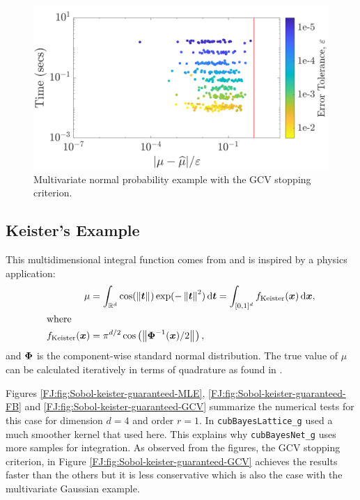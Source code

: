 \documentclass[graybox,footinfo]{svmult}
\newcommand{\norm}[2][{}]{\ensuremath{\left \lVert #2 \right \rVert}_{#1}}
\begin{document}
\begin{figure}
\centering
\includegraphics[width=0.95\linewidth]{"figures/Sobol/Sobol_MVN_guaranteed_time_GCV__d2_r1_2019-Sep-1"}
\caption[Sobol: MVN guaranteed: GCV]{Multivariate normal probability example with the GCV stopping criterion.}
\label{FJ:fig:Sobol-mvn-guaranteed-GCV}
\end{figure}






\subsection{Keister's Example}

This multidimensional integral function comes from \cite{Kei96} and is inspired by a physics application:
\begin{align}
\label{FJ:eqn:keister_integral}
\mu  &=  \int_{\R^d} \cos(\norm{ \bst}) \exp(-\norm{ \bst }^2) \, \textup{d}\bst 
= \int_{[0,1]^d} f_{\textup{Keister}}(\bsx) \, \textup{d}\bsx,\\
\intertext{where }
\nonumber
f_\textup{Keister}(\bsx) &= \pi^{d/2} \cos\left(\norm{ \bsPhi^{-1}(\bsx)/2}\right)  ,
\end{align}
and ${\boldsymbol{\Phi}}$ is the component-wise standard normal distribution.
The true value of $\mu$ can be calculated iteratively in terms of  quadrature as found in \cite[Section 5.2]{RatHic19a}.


Figures \ref{FJ:fig:Sobol-keister-guaranteed-MLE}, \ref{FJ:fig:Sobol-keister-guaranteed-FB} and \ref{FJ:fig:Sobol-keister-guaranteed-GCV} summarize the numerical tests for this case for dimension $d=4$ and order $r=1$.  
In \cite{RatHic19a} \texttt{cubBayesLattice\_g} used a much smoother kernel that used here.
This explains why \texttt{cubBayesNet\_g} uses more samples for integration.
As observed from the figures, the GCV stopping criterion, in Figure \ref{FJ:fig:Sobol-keister-guaranteed-GCV} achieves the results faster than the others but it is less conservative which is also the case with the multivariate Gaussian example.
\end{document}
